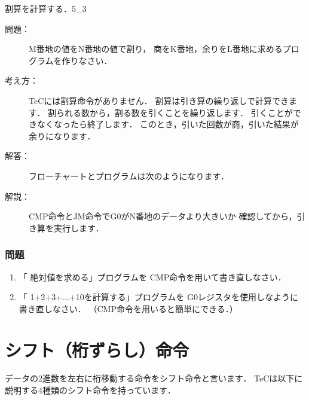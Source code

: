 \newpage
\begin{reidai}{割算を計算する．}{5_3}
\begin{description}
\item[問題：]
M番地の値をN番地の値で割り，
商をK番地，余りをL番地に求めるプログラムを作りなさい．

\item[考え方：]
TeCには割算命令がありません．
割算は引き算の繰り返しで計算できます．
割られる数から，割る数を引くことを繰り返します．
引くことができなくなったら終了します．
このとき，引いた回数が商，引いた結果が余りになります．

\item[解答：]
フローチャートとプログラムは次のようになります．\\

\begin{center}
\end{center}

\item[解説：]CMP命令とJM命令でG0がN番地のデータより大きいか
確認してから，引き算を実行します．

\end{description}
\end{reidai}

\vfill
\subsubsection{問題}
\begin{enumerate}
\item 「 絶対値を求める」プログラムを
CMP命令を用いて書き直しなさい．

\item 「 1+2+3+...+10を計算する」プログラムを
G0レジスタを使用しなように書き直しなさい．
（CMP命令を用いると簡単にできる．）
\end{enumerate}
\vfill

\newpage
\section{シフト（桁ずらし）命令}
データの2進数を左右に桁移動する命令をシフト命令と言います．
TeCは以下に説明する4種類のシフト命令を持っています．


